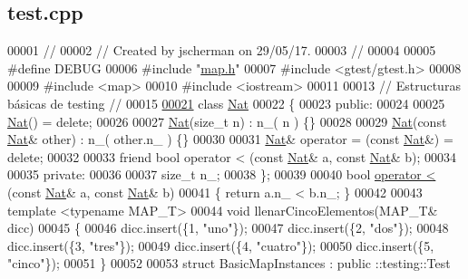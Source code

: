 \hypertarget{test_8cpp_source}{\subsection{test.\-cpp}
}

\begin{DoxyCode}
00001 \textcolor{comment}{//}
00002 \textcolor{comment}{// Created by jscherman on 29/05/17.}
00003 \textcolor{comment}{//}
00004 
00005 \textcolor{preprocessor}{#define DEBUG}
00006 \textcolor{preprocessor}{}\textcolor{preprocessor}{#include "\hyperlink{map_8h}{map.h}"}
00007 \textcolor{preprocessor}{#include <gtest/gtest.h>}
00008 
00009 \textcolor{preprocessor}{#include <map>}
00010 \textcolor{preprocessor}{#include <iostream>}
00011 
00013 \textcolor{comment}{// Estructuras básicas de testing //}
00015 \textcolor{comment}{}
\hypertarget{test_8cpp_source_l00021}{}\hyperlink{classNat}{00021} \textcolor{keyword}{class }\hyperlink{classNat}{Nat}
00022 \{
00023 \textcolor{keyword}{public}:
00024 
00025     \hyperlink{classNat}{Nat}() = \textcolor{keyword}{delete};
00026 
00027     \hyperlink{classNat}{Nat}(\textcolor{keywordtype}{size\_t} n) : n\_( n ) \{\}
00028 
00029     \hyperlink{classNat}{Nat}(\textcolor{keyword}{const} \hyperlink{classNat}{Nat}& other) : n\_( other.n\_ ) \{\}
00030 
00031     \hyperlink{classNat}{Nat}& operator = (\textcolor{keyword}{const} \hyperlink{classNat}{Nat}&) = \textcolor{keyword}{delete};
00032 
00033     \textcolor{keyword}{friend} \textcolor{keywordtype}{bool} operator < (\textcolor{keyword}{const} \hyperlink{classNat}{Nat}& a, \textcolor{keyword}{const} \hyperlink{classNat}{Nat}& b);
00034 
00035 \textcolor{keyword}{private}:
00036 
00037     \textcolor{keywordtype}{size\_t} n\_;
00038 \};
00039 
00040 \textcolor{keywordtype}{bool} \hyperlink{classaed2_1_1map_a8ff07f6a24c290ea7e8f63ec7ab24f8d_a8ff07f6a24c290ea7e8f63ec7ab24f8d}{operator < }(\textcolor{keyword}{const} \hyperlink{classNat}{Nat}& a, \textcolor{keyword}{const} \hyperlink{classNat}{Nat}& b)
00041 \{ \textcolor{keywordflow}{return} a.n\_ < b.n\_; \}
00042 
00043 \textcolor{keyword}{template} <\textcolor{keyword}{typename} MAP\_T>
00044 \textcolor{keywordtype}{void} llenarCincoElementos(MAP\_T& dicc)
00045 \{
00046     dicc.insert(\{1, \textcolor{stringliteral}{"uno"}\});
00047     dicc.insert(\{2, \textcolor{stringliteral}{"dos"}\});
00048     dicc.insert(\{3, \textcolor{stringliteral}{"tres"}\});
00049     dicc.insert(\{4, \textcolor{stringliteral}{"cuatro"}\});
00050     dicc.insert(\{5, \textcolor{stringliteral}{"cinco"}\});
00051 \}
00052 
00053 \textcolor{keyword}{struct }BasicMapInstances : \textcolor{keyword}{public} ::testing::Test

\end{DoxyCode}
